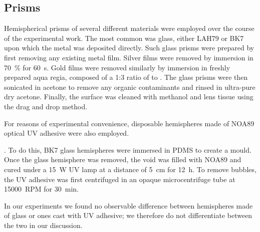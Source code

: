 \subsection{Prisms}
Hemispherical prisms of several different materials were employed over the
course of the experimental work.  The most common was glass, either LAH79
or BK7 upon which the metal was deposited directly.  Such glass prisms were
prepared by first removing any existing metal film.  Silver films were
removed by immersion in \SI{70}{\percent}  for \SI{60}{\second}.
Gold films were removed similarly by immersion in freshly prepared aqua
regia, composed of a 1:3 ratio of  to .  The glass prisms
were then sonicated in acetone to remove any organic contaminants and
rinsed in ultra-pure dry acetone.  Finally, the surface was cleaned with
methanol and lens tissue using the drag and drop method.

For reasons of experimental convenience, disposable hemispheres made of 
NOA89 optical UV adhesive were also employed.

.  To do this, BK7 glass
hemispheres were immersed in PDMS to create a mould.  Once the glass
hemisphere was removed, the void was filled with NOA89 and cured under a
\SI{15}{\watt} UV lamp at a distance of \SI{5}{\centi\meter} for
\SI{12}{\hour}.  To remove bubbles, the UV adhesive was first centrifuged
in an opaque microcentrifuge tube at \SI{15000}{RPM} for \SI{30}{\minute}.

In our experiments we found no observable difference between hemispheres
made of glass or ones cast with UV adhesive; we therefore do not
differentiate between the two in our discussion.  
